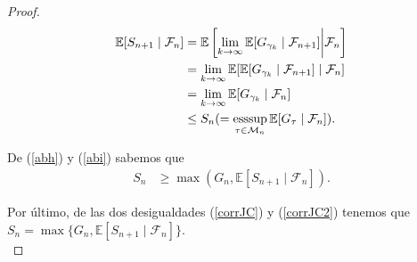 \begin{proof}
\begin{align}
	\mathbb{E}[S_{n+1} \mid \mathcal{F}_n] & = \mathbb{E}\left[\lim_{k \rightarrow \infty} \mathbb{E}[G_{\gamma_k} \mid \mathcal{F}_{n+1}] \bigg | \mathcal{F}_n \right]  \nonumber \\
	& = \lim_{k \rightarrow \infty} \mathbb{E}[\mathbb{E}[G_{\gamma_k} \mid \mathcal{F}_{n+1}] \mid \mathcal{F}_n] \nonumber \\
	& = \lim_{k \rightarrow \infty} \mathbb{E}[G_{\gamma_k} \mid \mathcal{F}_n] \nonumber \\
	& \leq S_n ( = \operatorname*{esssup}_{\tau \in \mathcal{M}_n} \mathbb{E}[G_\tau \mid \mathcal{F}_n]). \label{abi}
	\end{align}

De (\ref{abh}) y (\ref{abi}) sabemos que
\begin{align}
S_n & \geq \max (G_n, \mathbb{E}[S_{n+1} \mid \mathcal{F}_n]).
\end{align}

Por último, de las dos desigualdades (\ref{corrJC}) y (\ref{corrJC2}) tenemos que $S_n = \max \{G_n, \mathbb{E}[S_{n+1} \mid \mathcal{F}_n]\}$. \\


\end{proof}

